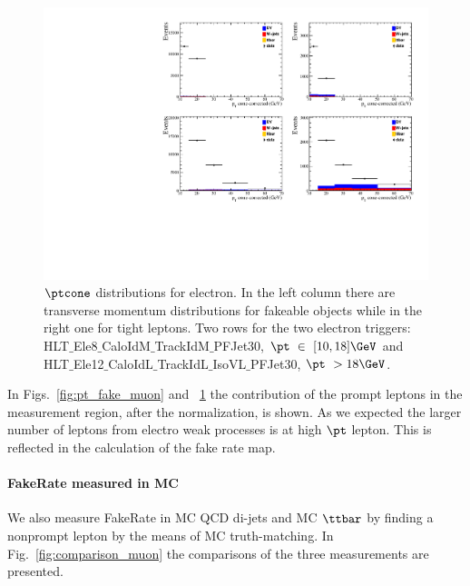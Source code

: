 \begin{figure}[h!]
\centering
\includegraphics[width=.7\textwidth]{Figures/c5/FAKE/pt_cone_ele.pdf}
\caption{$\ptcone$ distributions for electron. In the left column there are transverse momentum distributions for fakeable objects while in the right one for tight leptons. Two rows for the two electron triggers:
  HLT$\_$Ele8$\_$CaloIdM$\_$TrackIdM$\_$PFJet30, $\pt \ \in \ [10,18]
  \GeV$ and HLT$\_$Ele12$\_$CaloIdL$\_$TrackIdL$\_$IsoVL$\_$PFJet30, $\pt \ > 18 \GeV$.}
\label{fig:pt_fake_ele}
\end{figure}

In Figs.~\ref{fig:pt_fake_muon} and ~\ref{fig:pt_fake_ele} the
contribution of the prompt leptons in the measurement region, after
the normalization, is shown. As we expected the larger number of
leptons from electro weak processes is at high $\pt$ lepton. This is
reflected in the calculation of the fake rate map.

\paragraph{FakeRate measured in MC}
We also measure FakeRate in MC QCD di-jets and MC $\ttbar$ by finding a nonprompt lepton by the means of MC truth-matching. In Fig.~\ref{fig:comparison_muon} the comparisons of the three measurements are presented.

